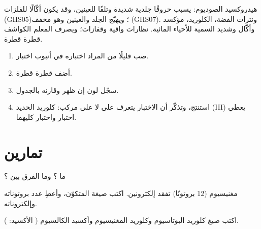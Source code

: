 \begin{safety}{}
هيدروكسيد الصوديوم: يسبب حروقًا جلدية شديدة وتلفًا للعينين، وقد يكون أكّالًا
للفلزات (GHS05)؛ ويهيّج الجلد والعينين وهو مخفف (GHS07). ونترات الفضة،
 الكلوريد، مؤكسد وأكّال وشديد السمية للأحياء المائية. نظارات واقية
وقفازات؛ ويصرف المعلم الكواشف قطرة قطرة.
\end{safety}

\begin{method}\label{met:g9:ions:test}
\begin{enumerate}
  \item صب قليلًا من  المراد اختباره في أنبوب اختبار.
  \item أضف  قطرة قطرة.
  \item سجّل لون  إن ظهر وقارنه بالجدول.
  \item استنتج، وتذكّر أن الاختبار يتعرف على  لا على مركب: 
        كلوريد الحديد (III) يعطي اختبار  واختبار 
        كليهما.
\end{enumerate}
\end{method}

\section{تمارين}

\begin{exercise}[$\star$]\label{exo:g9:ions:1}
ما ؟ وما الفرق بين  ؟
\end{exercise}

\begin{exercise}[$\star$]\label{exo:g9:ions:2}
 مغنيسيوم (12 بروتونًا) تفقد إلكترونين. اكتب صيغة  المتكوّن، وأعطِ
عدد بروتوناته وإلكتروناته.
\end{exercise}

\begin{exercise}[$\star$]\label{exo:g9:ions:3}
اكتب صيغ كلوريد البوتاسيوم وكلوريد المغنيسيوم وأكسيد الكالسيوم (
الأكسيد: ).
\end{exercise}

